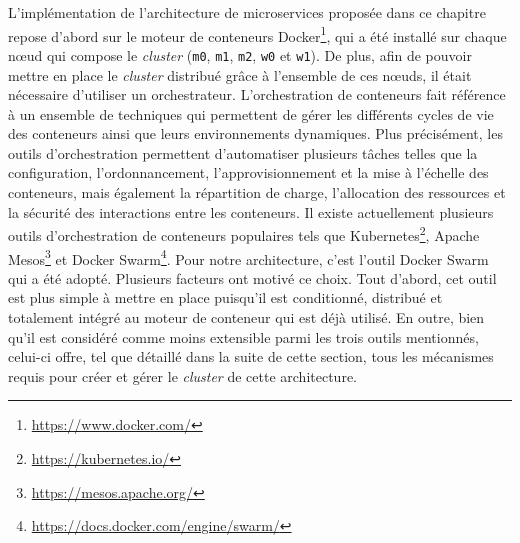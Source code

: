 L'implémentation de l'architecture de microservices proposée dans ce chapitre repose d'abord sur le moteur de conteneurs Docker\footnote{\url{https://www.docker.com/}}, qui a été installé sur chaque n\oe{}ud qui compose le \textit{cluster} (\texttt{m0}, \texttt{m1}, \texttt{m2}, \texttt{w0} et \texttt{w1}). De plus, afin de pouvoir mettre en place le \textit{cluster} distribué grâce à l'ensemble de ces n\oe{}uds, il était nécessaire d'utiliser un orchestrateur. L'orchestration de conteneurs fait référence à un ensemble de techniques qui permettent de gérer les différents cycles de vie des conteneurs ainsi que leurs environnements dynamiques. Plus précisément, les outils d'orchestration permettent d'automatiser plusieurs tâches telles que la configuration, l'ordonnancement, l'approvisionnement et la mise à l'échelle des conteneurs, mais également la répartition de charge, l'allocation des ressources et la sécurité des interactions entre les conteneurs. Il existe actuellement plusieurs outils d'orchestration de conteneurs populaires tels que Kubernetes\footnote{\url{https://kubernetes.io/}}, Apache Mesos\footnote{\url{https://mesos.apache.org/}} et Docker Swarm\footnote{\url{https://docs.docker.com/engine/swarm/}}. Pour notre architecture, c'est l'outil Docker Swarm qui a été adopté. Plusieurs facteurs ont motivé ce choix. Tout d'abord, cet outil est plus simple à mettre en place puisqu'il est conditionné, distribué et totalement intégré au moteur de conteneur qui est déjà utilisé. En outre, bien qu'il est considéré comme moins extensible parmi les trois outils mentionnés, celui-ci offre, tel que détaillé dans la suite de cette section, tous les mécanismes requis pour créer et gérer le \textit{cluster} de cette architecture.

